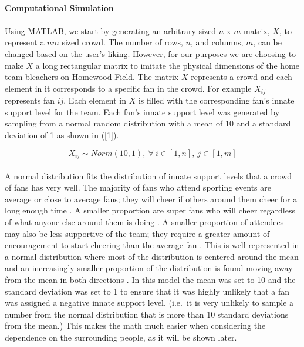 \documentclass[oneside,12pt]{report}
\begin{document}
\paragraph {Computational Simulation}
\paragraph{}
Using MATLAB, we start by generating an arbitrary sized $n$ x $m$ matrix, $X$, to represent a $nm$ sized crowd. The number of rows, $n$, and columns, $m$, can be changed based on the user's liking. However, for our purposes we are choosing to make $X$ a long rectangular matrix to imitate the physical dimensions of the home team bleachers on Homewood Field. The matrix $X$ represents a crowd and each element in it corresponds to a specific fan in the crowd. For example $X_{ij}$ represents fan $ij$. Each element in $X$ is filled with the corresponding fan's innate support level for the team. Each fan's innate support level was generated by sampling from a normal random distribution with a mean of 10 and a standard deviation of 1 as shown in (\ref{1}). 

\begin{equation}
X_{ij}\sim Norm(10,1),~\forall~i\in[1,n],~j\in[1,m]
\label{1}
\end{equation}

\paragraph{}
A normal distribution fits the distribution of innate support levels that a crowd of fans has very well. The majority of fans who attend sporting events are average or close to average fans; they will cheer if others around them cheer for a long enough time \cite{DI2003}. A smaller proportion are super fans who will cheer regardless of what anyone else around them is doing \cite{DI2003}. A smaller proportion of attendees may also be less supportive of the team; they require a greater amount of encouragement to start cheering than the average fan \cite{DI2003}. This is well represented in a normal distribution where most of the distribution is centered around the mean and an increasingly smaller proportion of the distribution is found moving away from the mean in both directions \cite{DI2003}. In this model the mean was set to 10 and the standard deviation was set to 1 to ensure that it was highly unlikely that a fan was assigned a negative innate support level. (i.e.~it is very unlikely to sample a number from the normal distribution that is more than 10 standard deviations from the mean.) This makes the math much easier when considering the dependence on the surrounding people, as it will be shown later.
\end{document}
